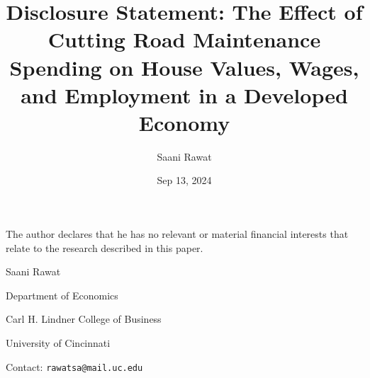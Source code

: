 \documentclass{article}
\title{\large {\bf Disclosure Statement}: The Effect of Cutting Road Maintenance Spending on House Values, Wages, and Employment in a Developed Economy}
\author{Saani Rawat}
\date{Sep 13, 2024}
\begin{document}
\maketitle

\begin{flushleft}
The author declares that he has no relevant or material financial interests that relate to the research described in this paper.

\vskip 1cm

Saani Rawat

Department of Economics

Carl H. Lindner College of Business

University of Cincinnati

Contact: \texttt{rawatsa@mail.uc.edu}
\end{flushleft}
\end{document}
